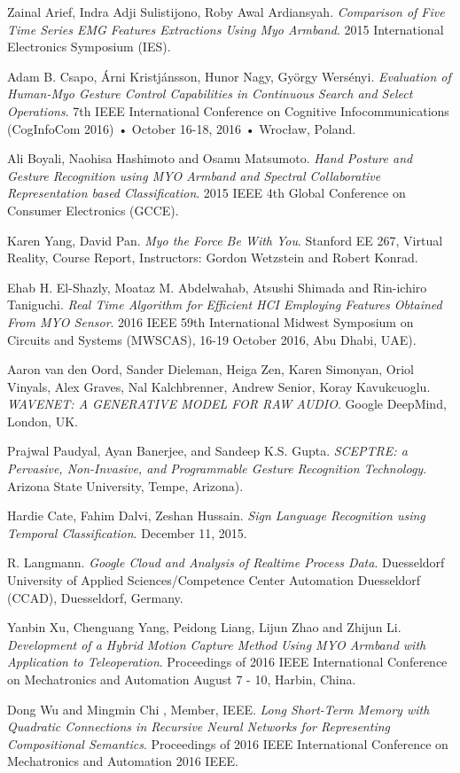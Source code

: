 \documentclass[conference,compsoc]{IEEEtran}
\begin{document}
\begin{thebibliography}{9}
Zainal Arief, Indra Adji Sulistijono, Roby Awal Ardiansyah. 
\textit{Comparison of Five Time Series EMG Features Extractions Using Myo Armband}. 
2015 International Electronics Symposium (IES).

Adam B. Csapo, Árni Kristjánsson, Hunor Nagy, György Wersényi. 
\textit{Evaluation of Human-Myo Gesture Control Capabilities in Continuous Search and Select Operations}. 
7th IEEE International Conference on Cognitive Infocommunications (CogInfoCom 2016) • October 16-18, 2016 • Wrocław, Poland.

Ali Boyali, Naohisa Hashimoto and Osamu Matsumoto. 
\textit{Hand Posture and Gesture Recognition using MYO Armband and Spectral Collaborative Representation based Classification}. 
2015 IEEE 4th Global Conference on Consumer Electronics (GCCE). 

Karen Yang, David Pan. 
\textit{Myo the Force Be With You}. 
Stanford EE 267, Virtual Reality, Course Report, Instructors: Gordon Wetzstein and Robert Konrad. 

Ehab H. El-Shazly, Moataz M. Abdelwahab, Atsushi Shimada and Rin-ichiro Taniguchi. 
\textit{Real Time Algorithm for Efficient HCI Employing Features Obtained From MYO Sensor}.
2016 IEEE 59th International Midwest Symposium on Circuits and Systems (MWSCAS), 16-19 October 2016, Abu Dhabi, UAE). 

Aaron van den Oord, Sander Dieleman, Heiga Zen, Karen Simonyan, Oriol Vinyals, Alex Graves, Nal Kalchbrenner, Andrew Senior, Koray Kavukcuoglu. 
\textit{WAVENET: A GENERATIVE MODEL FOR RAW AUDIO}. 
Google DeepMind, London, UK.

Prajwal Paudyal, Ayan Banerjee, and Sandeep K.S. Gupta. 
\textit{SCEPTRE: a Pervasive, Non-Invasive, and Programmable Gesture Recognition Technology}. 
Arizona State University, Tempe, Arizona). 

Hardie Cate, Fahim Dalvi, Zeshan Hussain. 
\textit{Sign Language Recognition using Temporal Classification}. 
December 11, 2015. 

R. Langmann. 
\textit{Google Cloud and Analysis of Realtime Process Data}. 
Duesseldorf University of Applied Sciences/Competence Center Automation Duesseldorf (CCAD), Duesseldorf, Germany. 

Yanbin Xu, Chenguang Yang, Peidong Liang, Lijun Zhao and Zhijun Li. 
\textit{Development of a Hybrid Motion Capture Method Using MYO Armband with Application to Teleoperation}. 
Proceedings of 2016 IEEE International Conference on Mechatronics and Automation August 7 - 10, Harbin, China.

Dong Wu and Mingmin Chi , Member, IEEE. 
\textit{Long Short-Term Memory with Quadratic Connections in Recursive Neural Networks for Representing Compositional Semantics}. 
Proceedings of 2016 IEEE International Conference on Mechatronics and Automation 2016 IEEE.


\end{thebibliography}
\end{document}
